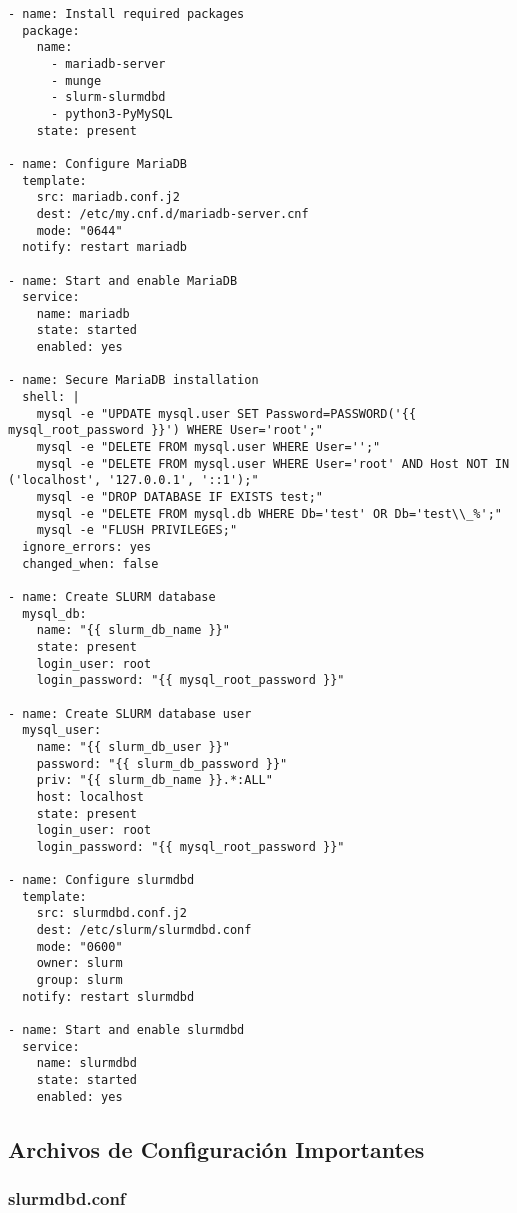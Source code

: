 \documentclass[12pt,a4paper]{article}
\begin{document}
\begin{lstlisting}[language=ansible, caption=Tareas principales para slurmdbd]
- name: Install required packages
  package:
    name:
      - mariadb-server
      - munge
      - slurm-slurmdbd
      - python3-PyMySQL
    state: present

- name: Configure MariaDB
  template:
    src: mariadb.conf.j2
    dest: /etc/my.cnf.d/mariadb-server.cnf
    mode: "0644"
  notify: restart mariadb

- name: Start and enable MariaDB
  service:
    name: mariadb
    state: started
    enabled: yes

- name: Secure MariaDB installation
  shell: |
    mysql -e "UPDATE mysql.user SET Password=PASSWORD('{{ mysql_root_password }}') WHERE User='root';"
    mysql -e "DELETE FROM mysql.user WHERE User='';"
    mysql -e "DELETE FROM mysql.user WHERE User='root' AND Host NOT IN ('localhost', '127.0.0.1', '::1');"
    mysql -e "DROP DATABASE IF EXISTS test;"
    mysql -e "DELETE FROM mysql.db WHERE Db='test' OR Db='test\\_%';"
    mysql -e "FLUSH PRIVILEGES;"
  ignore_errors: yes
  changed_when: false

- name: Create SLURM database
  mysql_db:
    name: "{{ slurm_db_name }}"
    state: present
    login_user: root
    login_password: "{{ mysql_root_password }}"

- name: Create SLURM database user
  mysql_user:
    name: "{{ slurm_db_user }}"
    password: "{{ slurm_db_password }}"
    priv: "{{ slurm_db_name }}.*:ALL"
    host: localhost
    state: present
    login_user: root
    login_password: "{{ mysql_root_password }}"

- name: Configure slurmdbd
  template:
    src: slurmdbd.conf.j2
    dest: /etc/slurm/slurmdbd.conf
    mode: "0600"
    owner: slurm
    group: slurm
  notify: restart slurmdbd

- name: Start and enable slurmdbd
  service:
    name: slurmdbd
    state: started
    enabled: yes
\end{lstlisting}

\subsection{Archivos de Configuración Importantes}

\subsubsection{slurmdbd.conf}
\end{document}
